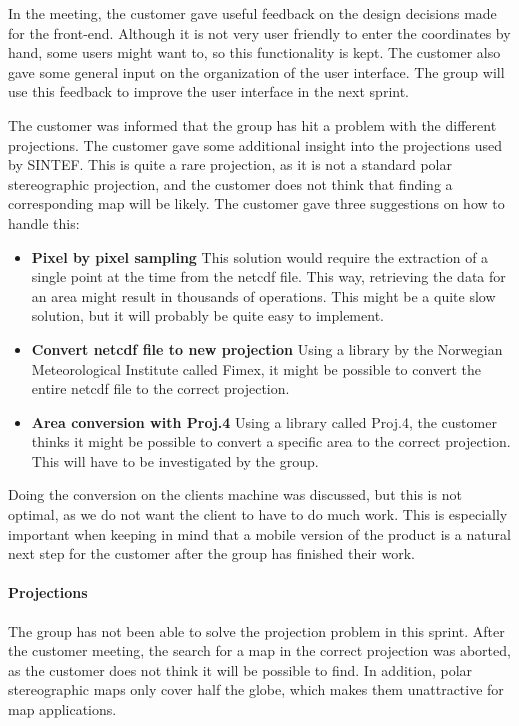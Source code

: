 \documentclass[11pt,a4paper,titlepage,oneside]{report}
\begin{document}
In the meeting, the customer gave useful feedback on the design decisions made for the \gls{front-end}. Although it is not very user friendly to enter the coordinates by hand, some users might want to, so this functionality is kept. The customer also gave some general input on the organization of the user interface. The group will use this feedback to improve the user interface in the next sprint. 

The customer was informed that the group has hit a problem with the different projections. The customer gave some additional insight into the projections used by SINTEF. This is quite a rare projection, as it is not a standard polar stereographic projection, and the customer does not think that finding a corresponding map will be likely. The customer gave three suggestions on how to handle this:
\begin{itemize}
\item \textbf{Pixel by pixel sampling} This solution would require the extraction of a single point at the time from the \gls{netcdf} file. This way, retrieving the data for an area might result in thousands of operations. This might be a quite slow solution, but it will probably be quite easy to implement.
\item \textbf{Convert \gls{netcdf} file to new projection} Using a library by the Norwegian Meteorological Institute called \gls{Fimex}, it might be possible to convert the entire \gls{netcdf} file to the correct projection. 
\item \textbf{Area conversion with Proj.4} Using a library called Proj.4, the customer thinks it might be possible to convert a specific area to the correct projection. This will have to be investigated by the group.
\end{itemize}

Doing the conversion on the clients machine was discussed, but this is not optimal, as we do not want the client to have to do much work. This is especially important when keeping in mind that a mobile version of the product is a natural next step for the customer after the group has finished their work.

\paragraph{Projections}
The group has not been able to solve the projection problem in this sprint. After the customer meeting, the search for a map in the correct projection was aborted, as the customer does not think it will be possible to find. In addition, polar stereographic maps only cover half the globe, which makes them unattractive for map applications. 
\end{document}
